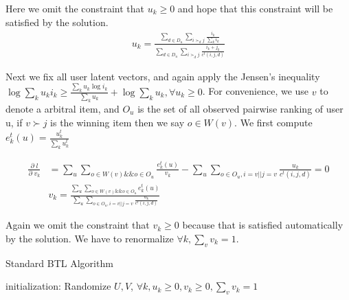 \documentclass{article}
\begin{document}
Here we omit the constraint that $u_k \geq 0$ and hope that this constraint will be satisfied by the solution.
\begin{align}
u_k = \frac{\sum_{d\in D_u} \sum_{i \succ_d j} \frac{i_k}{\sum_k i_k} }{\sum_{d\in D_u} \sum_{i \succ_d j}\frac{i_k+j_k}{c^t(i,j,d)}}
\end{align}


Next we fix all user latent vectors, and again apply the Jensen’s inequality $\log \sum_k u_k i_k \geq \frac{\sum_k u_k \log i_k}{\sum_k u_k}+ \log \sum_k u_k,\forall u_k \geq 0$.  For convenience, we use $v$  to denote a arbitral item, and $O_u$  is the set of all observed pairwise ranking of user u, if $ v \succ j $ is the winning item then we say $o \in W(v)$.  We first compute $e_k^t(u) = \frac{u_k^t}{\sum_k u_k^t}$

\begin{align}
\frac{\partial \;l}{\partial \;v_k}
 &=\sum_{u} \sum_{o \in W(v) \&\& o \in O_u} \frac{e_k^t(u)}{v_k} - \sum_{u} \sum_{o \in O_u,i=v||j=v} \frac{u_k}{c^t(i, j, d)} =0\\
 & v_k =\frac{\sum_{u} \sum_{o \in W(v) \&\& o \in O_u} e_k^t(u)}{\sum_{u} \sum_{o \in O_u,i=v||j=v} \frac{u_k}{c^t(i, j, d)}}
\end{align}

Again we omit the constraint that $v_k \geq 0$ because that is satisfied automatically by the solution. We have to renormalize $\forall k, \sum_v v_k =1 $.

\begin{algorithm}[H]
    \caption{Standard BTL Algorithm}

    initialization: Randomize $U,V$, $\forall k, u_k\geq 0, v_k \geq 0, \sum_v v_k=1$ \;
\end{algorithm}
\end{document}
